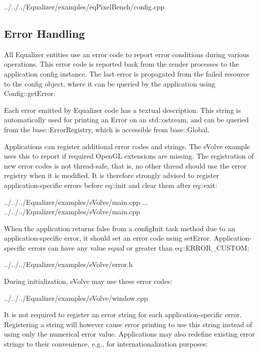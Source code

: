 \documentclass[10pt,a4]{scrartcl}
\begin{document}
{\footnotesize
  {../../../Equalizer/examples/eqPixelBench/config.cpp}}


\subsection{\label{sErrorHandling}Error Handling}

All Equalizer entities use an error code to report error conditions during
various operations. This error code is reported back from the render processes
to the application config instance. The last error is propagated from the failed
resource to the config object, where it can be queried by the application using
\textsf{Config::getError}.

Each error emitted by Equalizer code has a textual description. This string is
automatically used for printing an \textsf{Error} on an \textsf{std::ostream},
and can be queried from the \textsf{base::ErrorRegistry}, which is accessible
from \textsf{base::Global}.

Applications can register additional error codes and strings. The
\textsf{eVolve} example uses this to report if required OpenGL extensions are
missing. The registration of new error codes is not thread-safe, that is, no
other thread should use the error registry when it is modified. It is therefore
strongly advised to register application-specific errors before
\textsf{eq::init} and clear them after \textsf{eq::exit}:

{\footnotesize
  {../../../Equalizer/examples/eVolve/main.cpp}}
...
{\footnotesize
  {../../../Equalizer/examples/eVolve/main.cpp}}

When the application returns false from a \textsf{configInit} task method due to
an application-specific error, it should set an error code using
\textsf{setError}. Application-specific errors can have any value equal or
greater than \textsf{eq::ERROR\_CUSTOM}:

{\footnotesize
  {../../../Equalizer/examples/eVolve/error.h}}

During initialization, eVolve may use these error codes:

{\footnotesize
  {../../../Equalizer/examples/eVolve/window.cpp}}

It is not required to register an error string for each application-specific
error. Registering a string will however cause error printing to use this string
instead of using only the numerical error value. Applications may also redefine
existing error strings to their convenience, e.g., for internationalization
purposes:
\end{document}
